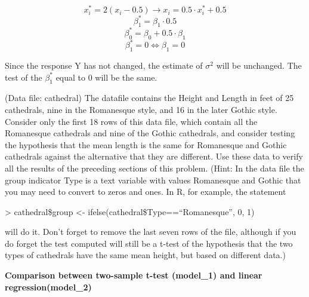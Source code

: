 \documentclass[12pt,oneside,a4paper]{article}\usepackage[]{graphicx}\usepackage[]{xcolor}
\newenvironment{problem}[2][Problem]{\begin{trivlist}
\item[\hskip \labelsep {\bfseries #1}\hskip \labelsep {\bfseries #2.}]}{\end{trivlist}}
\begin{document}
$$x_{i}^{*} = 2(x_{i} - 0.5) \rightarrow x_{i} = 0.5 \cdot x_{i}^{*} + 0.5$$
$$\beta_{1}^{*} = \beta_{1} \cdot 0.5$$
$$\beta_{0}^{*} = \beta_{0} + 0.5 \cdot \beta_{1}$$
$$\beta_{1}^{*} = 0 \iff \beta_{1} = 0$$

Since the response Y has not changed, the estimate of $\sigma^2$ will be unchanged. The test of the $\beta_{1}^{*}$ equal to 0 will be the same.

\begin{problem}{2.10.6}
(Data file: cathedral) The datafile contains the Height and Length in feet of 25 cathedrals, nine in the Romanesque style, and 16 in the later Gothic style. Consider only the first 18 rows of this data file, which contain all the Romanesque cathedrals and nine of the Gothic cathedrals, and consider testing the hypothesis that the mean length is the same for Romanesque and Gothic cathedrals against the alternative that they are different. Use these data to verify all the results of the preceding sections of this problem. (Hint: In the data file the group indicator Type is a text variable with values Romanesque and Gothic that you may need to convert to zeros and ones. In R, for example, the statement

> cathedral\$group <-
ifelse(cathedral\$Type==“Romanesque”, 0, 1)

will do it. Don’t forget to remove the last seven rows of the file, although if you do forget the test computed will still be a t-test of the hypothesis that the two types of cathedrals have the same mean height, but based on different data.)
\end{problem}

\textbf{Comparison between two-sample t-test (model\_1) and linear regression(model\_2)}
\end{document}
